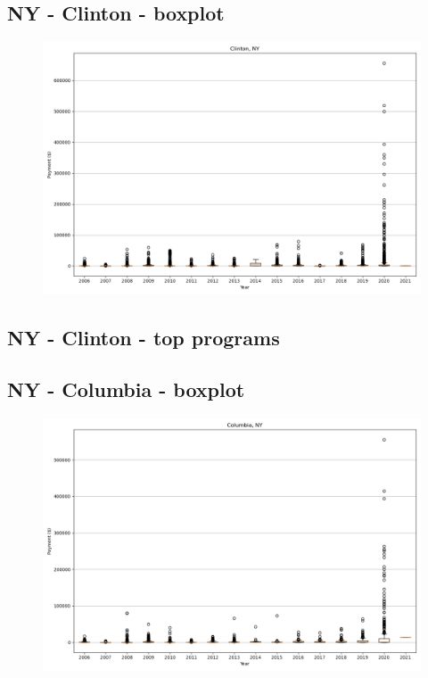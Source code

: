 \subsection*{NY - Clinton - boxplot}
\begin{figure}[h]
\centering
\includegraphics[width=7in]{../output/boxplots/counties/Clinton-NY_boxplot.png}
\end{figure}


\subsection*{NY - Clinton - top programs}

\newpage
\subsection*{NY - Columbia - boxplot}
\begin{figure}[h]
\centering
\includegraphics[width=7in]{../output/boxplots/counties/Columbia-NY_boxplot.png}
\end{figure}


